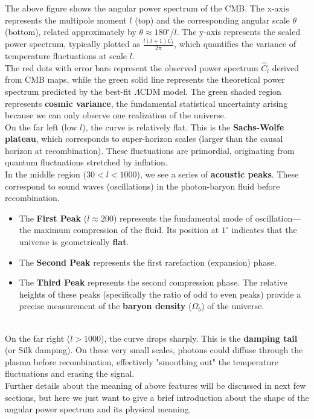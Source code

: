 \clearpage
\begin{extra}
    The above figure shows the angular power spectrum of the CMB. The x-axis represents the multipole moment $l$ (top) and the corresponding angular scale $\theta$ (bottom), related approximately by $\theta \approx 180^\circ / l$. The y-axis represents the scaled power spectrum, typically plotted as $\frac{l(l+1)C_l}{2\pi}$, which quantifies the variance of temperature fluctuations at scale $l$. \\

    The red dots with error bars represent the observed power spectrum $\hat{C}_l$ derived from CMB maps, while the green solid line represents the theoretical power spectrum predicted by the best-fit $\Lambda$CDM model. The green shaded region represents \textbf{cosmic variance}, the fundamental statistical uncertainty arising because we can only observe one realization of the universe. \\

    On the far left (low $l$), the curve is relatively flat. This is the \textbf{Sachs-Wolfe plateau}, which corresponds to super-horizon scales (larger than the causal horizon at recombination). These fluctuations are primordial, originating from quantum fluctuations stretched by inflation. \\

    In the middle region ($30 < l < 1000$), we see a series of \textbf{acoustic peaks}. These correspond to sound waves (oscillations) in the photon-baryon fluid before recombination.
    \begin{itemize}
        \item The \textbf{First Peak} ($l \approx 200$) represents the fundamental mode of oscillation—the maximum compression of the fluid. Its position at $1^\circ$ indicates that the universe is geometrically \textbf{flat}.
        \item The \textbf{Second Peak} represents the first rarefaction (expansion) phase.
        \item The \textbf{Third Peak} represents the second compression phase. The relative heights of these peaks (specifically the ratio of odd to even peaks) provide a precise measurement of the \textbf{baryon density} ($\Omega_b$) of the universe.
    \end{itemize} \\

    On the far right ($l > 1000$), the curve drops sharply. This is the \textbf{damping tail} (or Silk damping). On these very small scales, photons could diffuse through the plasma before recombination, effectively "smoothing out" the temperature fluctuations and erasing the signal. \\

    Further details about the meaning of above features will be discussed in next few sections, but here we just want to give a brief introduction about the shape of the angular power spectrum and its physical meaning.
\end{extra}



